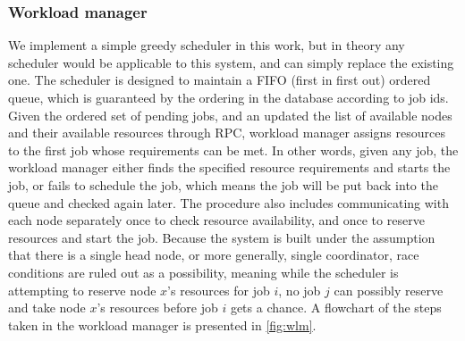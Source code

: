 \documentclass[sigconf]{acmart}
\begin{document}
\subsubsection{Workload manager}
\label{sec:wlm}
We implement a simple greedy scheduler in this work, but in theory any scheduler would be applicable to this system, and can
simply replace the existing one.
The scheduler is designed to maintain a FIFO (first in first out) ordered queue, which is guaranteed by the ordering in the
database according to job ids.
Given the ordered set of pending jobs, and an updated the list of available nodes and their available resources through
RPC, workload manager assigns resources to the first job whose requirements can be met.
In other words, given any job, the workload manager either finds the specified resource requirements and starts the job, or
fails to schedule the job, which means the job will be put back into the queue and checked again later.
The procedure also includes communicating with each node separately once to check resource availability, and once to reserve
resources and start the job.
Because the system is built under the assumption that there is a single head node, or more generally, single coordinator, race
conditions are ruled out as a possibility, meaning while the scheduler is attempting to reserve node $x$'s resources for job
$i$, no job $j$ can possibly reserve and take node $x$'s resources before job $i$ gets a chance.
A flowchart of the steps taken in the workload manager is presented in \cref{fig:wlm}.
\end{document}
